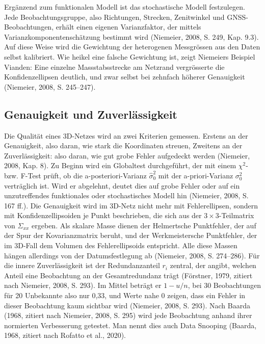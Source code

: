 Ergänzend zum funktionalen Modell ist das stochastische Modell festzulegen. Jede Beobachtungsgruppe, also Richtungen, Strecken, Zenitwinkel und GNSS-Beobachtungen, erhält einen eigenen Varianzfaktor, der mittels Varianzkomponentenschätzung bestimmt wird (Niemeier, 2008, S. 249, Kap. 9.3). Auf diese Weise wird die Gewichtung der heterogenen Messgrössen aus den Daten selbst kalibriert. Wie heikel eine falsche Gewichtung ist, zeigt Niemeiers Beispiel Vianden: Eine einzelne Massstabsstrecke am Netzrand vergrösserte die Konfidenzellipsen deutlich, und zwar selbst bei zehnfach höherer Genauigkeit (Niemeier, 2008, S. 245–247).

\subsection{Genauigkeit und Zuverlässigkeit}
\label{sec:Genauigkeit und Zuverlässigkeit}
Die Qualität eines 3D-Netzes wird an zwei Kriterien gemessen. Erstens an der Genauigkeit, also daran, wie stark die Koordinaten streuen, Zweitens an der Zuverlässigkeit: also daran, wie gut grobe Fehler aufgedeckt werden (Niemeier, 2008, Kap. 8). 
Zu Beginn wird ein Globaltest durchgeführt, der mit einem $\chi^2$- bzw. F-Test prüft, ob die a-posteriori-Varianz $\hat{\sigma}_0^2$ mit der a-priori-Varianz $\sigma_0^2$ verträglich ist. Wird er abgelehnt, deutet dies auf grobe Fehler oder auf ein unzutreffendes funktionales oder stochastisches Modell hin (Niemeier, 2008, S. 167 ff.). 
Die Genauigkeit wird im 3D-Netz nicht mehr mit Fehlerellipsen, sondern mit Konfidenzellipsoiden je Punkt beschrieben, die sich aus der $3 \times 3$-Teilmatrix von $\Sigma_{xx}$ ergeben. 
Als skalare Masse dienen der Helmertsche Punktfehler, der auf der Spur der Kovarianzmatrix beruht, und der Werkmeistersche Punktfehler, der im 3D-Fall dem Volumen des Fehlerellipsoids entspricht. Alle diese Massen hängen allerdings von der Datumsfestlegung ab (Niemeier, 2008, S. 274--286). 
Für die innere Zuverlässigkeit ist der Redundanzanteil $r_i$ zentral, der angibt, welchen Anteil eine Beobachtung an der Gesamtredundanz trägt (Förstner, 1979, zitiert nach Niemeier, 2008, S. 293). 
Im Mittel beträgt er $1-u/n$, bei 30 Beobachtungen für 20 Unbekannte also nur 0,33, und Werte nahe 0 zeigen, dass ein Fehler in dieser Beobachtung kaum sichtbar wird (Niemeier, 2008, S. 293). 
Nach Baarda (1968, zitiert nach Niemeier, 2008, S. 295) wird jede Beobachtung anhand ihrer normierten Verbesserung getestet. Man nennt dies auch Data Snooping (Baarda, 1968, zitiert nach Rofatto et al., 2020).\bigskip 

